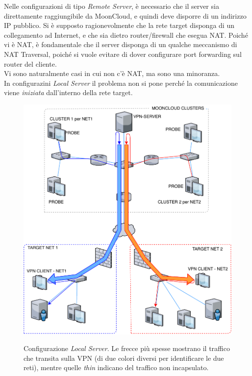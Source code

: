 Nelle configurazioni di tipo \textit{Remote Server}, è necessario che il server sia
direttamente raggiungibile da MoonCloud, e quindi deve disporre di un indirizzo IP pubblico.
Si è supposto ragionevolmente che la rete target disponga di un collegamento ad Internet, e che
sia dietro router/firewall che esegua NAT. Poiché vi è NAT, è fondamentale che il server disponga
di un qualche meccanismo di NAT Traversal, poiché si vuole evitare di dover configurare
port forwarding sul router del cliente.\\
Vi sono naturalmente casi in cui non c'è NAT, ma sono una minoranza.\\
In configurazini \textit{Local Server} il problema non si pone perché la comunicazione viene
\textit{iniziata} dall'interno della rete target.

\begin{figure}[h]
	\includegraphics[scale=0.6]{img/ls}
	\label{fig:ls}
	\caption[Configurazione \textit{Local Server}]{Configurazione \textit{Local Server}. Le frecce
		più spesse mostrano il traffico che transita sulla VPN (di due colori diversi per identificare
		le due reti), mentre quelle \textit{thin} indicano del traffico non incapsulato.}
\end{figure}

